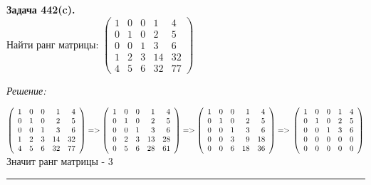 \documentclass[a4paper, 12pt]{article}
\newenvironment{problem}[2][Задача]
    { \begin{mdframed}[backgroundcolor=gray!10] \textbf{#1 #2.} \\}
    {  \end{mdframed}}
\newenvironment{solution}
    {\textit{Решение: }}
    {\noindent\rule{7in}{1.5pt}}
\begin{document}
\begin{problem}{442(c)}
Найти ранг матрицы:
$\left(\begin{array}{rrrrr}1 & 0 & 0 & 1 & 4\\0 & 1 & 0 & 2 & 5\\ 0 & 0 & 1 & 3 & 6 \\ 1 & 2 & 3 & 14 & 32\\ 4 & 5 & 6 & 32 & 77\end{array}\right)$

\end{problem}
\begin{solution}

$
\left(
  \begin{array}{rrrrr}
    1 & 0 & 0 & 1 & 4 \\
    0 & 1 & 0 & 2 & 5 \\
    0 & 0 & 1 & 3 & 6 \\
    1 & 2 & 3 & 14 & 32 \\
    4 & 5 & 6 & 32 & 77 \\
  \end{array}
\right)
=>
\left(
  \begin{array}{rrrrr}
    1 & 0 & 0 & 1 & 4 \\
    0 & 1 & 0 & 2 & 5 \\
    0 & 0 & 1 & 3 & 6 \\
    0 & 2 & 3 & 13 & 28 \\
    0 & 5 & 6 & 28 & 61 \\
  \end{array}
\right)
=>
\left(
  \begin{array}{rrrrr}
    1 & 0 & 0 & 1 & 4 \\
    0 & 1 & 0 & 2 & 5 \\
    0 & 0 & 1 & 3 & 6 \\
    0 & 0 & 3 & 9 & 18 \\
    0 & 0 & 6 & 18 & 36 \\
  \end{array}
\right)
=> \\
\left(
  \begin{array}{rrrrr}
    1 & 0 & 0 & 1 & 4 \\
    0 & 1 & 0 & 2 & 5 \\
    0 & 0 & 1 & 3 & 6 \\
    0 & 0 & 0 & 0 & 0 \\
    0 & 0 & 0 & 0 & 0 \\
  \end{array}
\right)
$
Значит ранг матрицы - 3

\end{solution}

\end{document}
